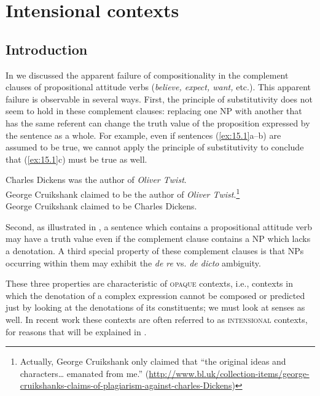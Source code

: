 \chapter{Intensional contexts}\label{sec:15}

\section{Introduction}\label{sec:15.1}

In  we discussed the apparent failure of compositionality in the complement clauses of propositional attitude verbs (\textit{believe, expect, want,} etc.). This apparent failure is observable in several ways. First, the principle of substitutivity does not seem to hold in these complement clauses: replacing one NP with another that has the same referent can change the truth value of the proposition expressed by the sentence as a whole. For example, even if sentences (\ref{ex:15.1}a--b) are assumed to be true, we cannot apply the principle of substitutivity to conclude that (\ref{ex:15.1}c) must be true as well.


\ea \label{ex:15.1}
\ea  Charles Dickens was the author of \textit{Oliver Twist}.\\
\ex George Cruikshank claimed to be the author of \textit{Oliver Twist}.\footnote{Actually, George Cruikshank only claimed that “the original ideas and characters… emanated from me.” (\url{http://www.bl.uk/collection-items/george-cruikshanks-claims-of-plagiarism-against-charles-Dickens})}\\
\ex George Cruikshank claimed to be Charles Dickens.
                       \z
\z


Second, as illustrated in , a sentence which contains a propositional attitude verb may have a truth value even if the complement clause contains a NP which lacks a denotation. A third special property of these complement clauses is that NPs occurring within them may exhibit the \textit{de re} vs. \textit{de dicto} ambiguity.



These three properties are characteristic of \textsc{opaque} contexts, i.e., contexts in which the denotation of a complex expression cannot be composed or predicted just by looking at the denotations of its constituents; we must look at senses as well. In recent work these contexts are often referred to as \textsc{intensional} contexts, for reasons that will be explained in .



